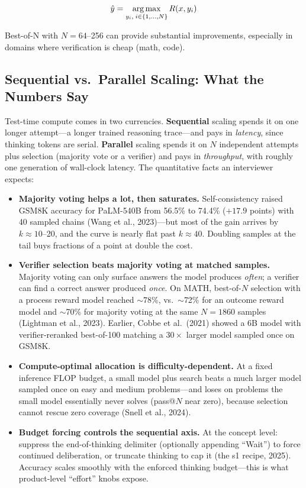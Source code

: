 \begin{equation}
\hat{y} = \operatorname*{arg\,max}_{y_i,\; i \in \{1, \ldots, N\}} R(x, y_i)
\label{eq:best_of_n}
\end{equation}

Best-of-N with $N = 64$--256 can provide substantial improvements,
especially in domains where verification is cheap (math, code).

\subsection{Sequential vs.\ Parallel Scaling: What the Numbers Say}

Test-time compute comes in two currencies.  \textbf{Sequential} scaling
spends it on one longer attempt---a longer trained reasoning trace---and
pays in \emph{latency}, since thinking tokens are serial.  \textbf{Parallel}
scaling spends it on $N$ independent attempts plus selection (majority vote
or a verifier) and pays in \emph{throughput}, with roughly one generation of
wall-clock latency.  The quantitative facts an interviewer expects:

\begin{itemize}[leftmargin=*]
\item \textbf{Majority voting helps a lot, then saturates.}
  Self-consistency raised GSM8K accuracy for PaLM-540B from 56.5\% to
  74.4\% ($+17.9$ points) with 40 sampled chains (Wang et al., 2023)---but
  most of the gain arrives by $k \approx 10$--20, and the curve is nearly
  flat past $k \approx 40$.  Doubling samples at the tail buys fractions of
  a point at double the cost.
\item \textbf{Verifier selection beats majority voting at matched samples.}
  Majority voting can only surface answers the model produces \emph{often};
  a verifier can find a correct answer produced \emph{once}.  On MATH,
  best-of-$N$ selection with a process reward model reached $\sim$78\%,
  vs.\ $\sim$72\% for an outcome reward model and $\sim$70\% for majority
  voting at the same $N = 1860$ samples (Lightman et al., 2023).  Earlier,
  Cobbe et al.\ (2021) showed a 6B model with verifier-reranked
  best-of-100 matching a $30\times$ larger model sampled once on GSM8K.
\item \textbf{Compute-optimal allocation is difficulty-dependent.}  At a
  fixed inference FLOP budget, a small model plus search beats a much
  larger model sampled once on easy and medium problems---and loses on
  problems the small model essentially never solves (pass@$N$ near zero),
  because selection cannot rescue zero coverage (Snell et al., 2024).
\item \textbf{Budget forcing controls the sequential axis.}  At the concept
  level: suppress the end-of-thinking delimiter (optionally appending
  ``Wait'') to force continued deliberation, or truncate thinking to cap
  it (the s1 recipe, 2025).  Accuracy scales smoothly with the enforced
  thinking budget---this is what product-level ``effort'' knobs expose.
\end{itemize}

